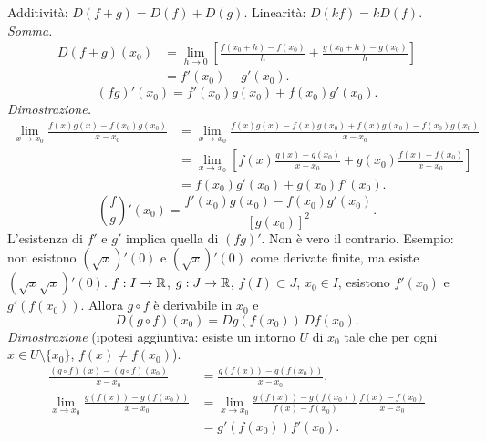 \begin{center}\end{center}
Additività: $D(f+g)=D(f)+D(g)$.
Linearità: $D(kf)=kD(f)$.
\textit{Somma.}
\begin{align*}
D(f+g)(x_0)&=\lim_{h\to0}\left[\frac{f(x_0+h)-f(x_0)}h+\frac{g(x_0+h)-g(x_0)}h\right]\\
&=f'(x_0)+g'(x_0).
\end{align*}
\[(fg)'(x_0)=f'(x_0)g(x_0)+f(x_0)g'(x_0).\]
\textit{Dimostrazione.}
\begin{align*}
\lim_{x\to x_0}\frac{f(x)g(x)-f(x_0)g(x_0)}{x-x_0}
&=\lim_{x\to x_0}\frac{f(x)g(x)-f(x)g(x_0)+f(x)g(x_0)-f(x_0)g(x_0)}{x-x_0}\\
&=\lim_{x\to x_0}\left[f(x)\frac{g(x)-g(x_0)}{x-x_0}+g(x_0)\frac{f(x)-f(x_0)}{x-x_0}\right]\\
&=f(x_0)g'(x_0)+g(x_0)f'(x_0).
\end{align*}
\[\left(\frac fg\right)'(x_0)=\frac{f'(x_0)g(x_0)-f(x_0)g'(x_0)}{[g(x_0)]^2}.\]
L'esistenza di $f'$ e $g'$ implica quella di $(fg)'$. Non è vero il contrario.
Esempio: non esistono $(\sqrt{x})'(0)$ e $(\sqrt{x})'(0)$ come derivate finite, ma esiste $(\sqrt{x}\sqrt{x})'(0)$.
$f:I\to\mathbb R$, $g:J\to\mathbb R$, $f(I)\subset J$, $x_0\in I$, esistono $f'(x_0)$ e $g'(f(x_0))$. Allora $g\circ f$ è derivabile in $x_0$ e
\[D(g\circ f)(x_0)=Dg(f(x_0))\,Df(x_0).\]
\textit{Dimostrazione} (ipotesi aggiuntiva: esiste un intorno $U$ di $x_0$ tale che per ogni $x\in U\setminus\{x_0\}$, $f(x)\ne f(x_0)$).
\begin{align*}
\frac{(g\circ f)(x)-(g\circ f)(x_0)}{x-x_0}&=\frac{g(f(x))-g(f(x_0))}{x-x_0},\\
\lim_{x\to x_0}\frac{g(f(x))-g(f(x_0))}{x-x_0}
&=\lim_{x\to x_0}\frac{g(f(x))-g(f(x_0))}{f(x)-f(x_0)}\frac{f(x)-f(x_0)}{x-x_0}\\
&=g'(f(x_0))f'(x_0).
\end{align*}
